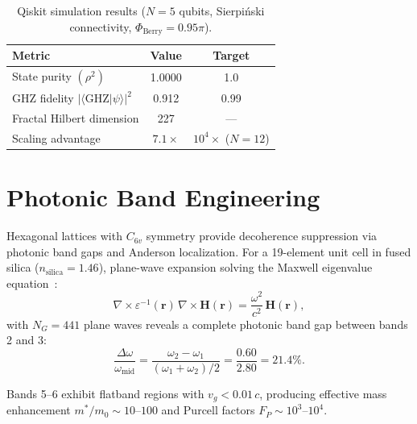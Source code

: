 \documentclass[aps,prx,twocolumn,groupedaddress,longbibliography]{revtex4-2}
\theoremstyle{plain}
\theoremstyle{definition}
\begin{document}
\begin{table}[h]
\caption{Qiskit simulation results ($N = 5$ qubits, Sierpi\'{n}ski connectivity, $\Phi_\mathrm{Berry} = 0.95\pi$).}
\label{tab:qiskit}
\begin{ruledtabular}
\begin{tabular}{lcc}
\textbf{Metric} & \textbf{Value} & \textbf{Target} \\
\hline
State purity $(\rho^2)$ & 1.0000 & 1.0 \\
GHZ fidelity $|\langle\mathrm{GHZ}|\psi\rangle|^2$ & 0.912 & 0.99 \\
Fractal Hilbert dimension & 227 & --- \\
Scaling advantage & $7.1\times$ & $10^4\times$ ($N{=}12$) \\
\end{tabular}
\end{ruledtabular}
\end{table}


\section{Photonic Band Engineering}
\label{sec:photonics}

Hexagonal lattices with $C_{6v}$ symmetry provide decoherence suppression via photonic band gaps and Anderson localization. For a 19-element unit cell in fused silica ($n_\mathrm{silica} = 1.46$), plane-wave expansion solving the Maxwell eigenvalue equation~\cite{Joannopoulos2008}:
\begin{equation}
\nabla \times \varepsilon^{-1}(\mathbf{r})\,\nabla \times \mathbf{H}(\mathbf{r}) = \frac{\omega^2}{c^2}\,\mathbf{H}(\mathbf{r}),
\end{equation}
with $N_G = 441$ plane waves reveals a complete photonic band gap between bands 2 and 3:
\begin{equation}
\frac{\Delta\omega}{\omega_\mathrm{mid}} = \frac{\omega_2 - \omega_1}{(\omega_1 + \omega_2)/2} = \frac{0.60}{2.80} = 21.4\%.
\end{equation}

Bands 5--6 exhibit flatband regions with $v_g < 0.01\,c$, producing effective mass enhancement $m^*/m_0 \sim 10$--$100$ and Purcell factors $F_P \sim 10^3$--$10^4$.
\end{document}
